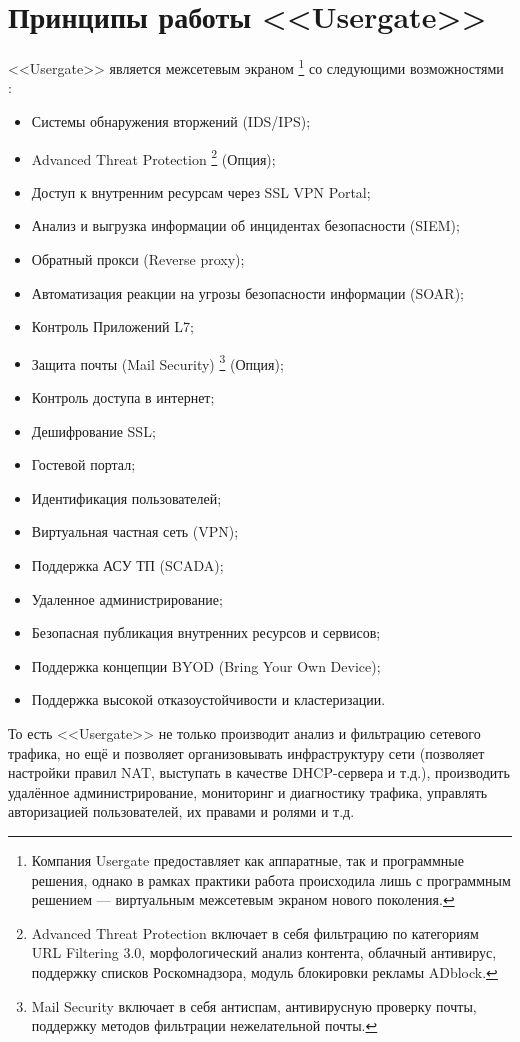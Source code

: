 \section{Принципы работы <<Usergate>>}
	\begin{justify}	
		\newPar{}<<Usergate>> является межсетевым экраном \footnote{Компания Usergate предоставляет как аппаратные, так и программные решения, однако в рамках практики работа происходила лишь с программным решением --- виртуальным межсетевым экраном нового поколения.} со следующими возможностями \cite{usergate_capabilities}:
		
		\begin{itemize}
			\item Системы обнаружения вторжений (IDS/IPS);
			\item Advanced Threat Protection \footnote{Advanced Threat Protection включает в себя фильтрацию по категориям URL Filtering 3.0, морфологический анализ контента, облачный антивирус, поддержку списков Роскомнадзора, модуль блокировки рекламы ADblock.} (Опция);
			\item Доступ к внутренним ресурсам через SSL VPN Portal;
			\item Анализ и выгрузка информации об инцидентах безопасности (SIEM);
			\item Обратный прокси (Reverse proxy);
			\item Автоматизация реакции на угрозы безопасности информации (SOAR);
			\item Контроль Приложений L7;
			\item Защита почты (Mail Security) \footnote{Mail Security включает в себя антиспам, антивирусную проверку почты, поддержку методов фильтрации нежелательной почты.} (Опция);
			\item Контроль доступа в интернет;
			\item Дешифрование SSL;
			\item Гостевой портал;
			\item Идентификация пользователей;
			\item Виртуальная частная сеть (VPN);
			\item Поддержка АСУ ТП (SCADA);
			\item Удаленное администрирование;
			\item Безопасная публикация внутренних ресурсов и сервисов;
			\item Поддержка концепции BYOD (Bring Your Own Device);
			\item Поддержка высокой отказоустойчивости и кластеризации.
		\end{itemize}
	
		То есть <<Usergate>> не только производит анализ и фильтрацию сетевого трафика, но ещё и позволяет организовывать инфраструктуру сети (позволяет настройки правил NAT, выступать в качестве DHCP-сервера и т.д.), производить удалённое администрирование, мониторинг и диагностику трафика, управлять авторизацией пользователей, их правами и ролями и т.д.
	\end{justify}
